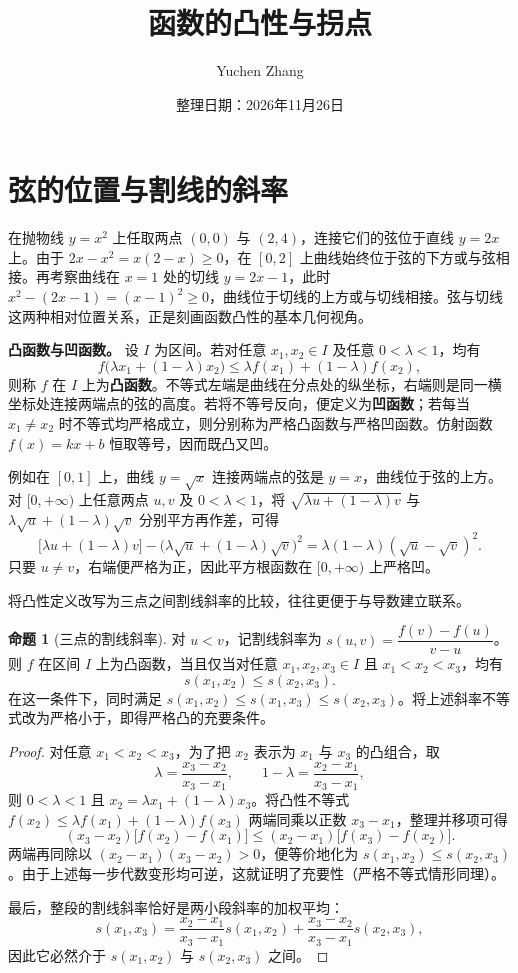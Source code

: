 \documentclass[UTF8,fontset=fandol,a4paper,12pt]{ctexart}
\title{函数的凸性与拐点}
\author{Yuchen Zhang}
\date{整理日期：2026年11月26日}
\makeatletter
\theoremstyle{definition}
\newtheorem{proposition}[theorem]{命题}
\renewcommand{\maketitle}{\begin{center}{\LARGE\bfseries\@title\par}\vspace{0.6em}\@author\par\vspace{0.2em}{\small\@date\par}\end{center}}
\makeatother
\begin{document}
\maketitle

\section{弦的位置与割线的斜率}
在抛物线 $y=x^2$ 上任取两点 $(0,0)$ 与 $(2,4)$，连接它们的弦位于直线 $y=2x$ 上。由于 $2x-x^2=x(2-x)\ge0$，在 $[0,2]$ 上曲线始终位于弦的下方或与弦相接。再考察曲线在 $x=1$ 处的切线 $y=2x-1$，此时 $x^2-(2x-1)=(x-1)^2\ge0$，曲线位于切线的上方或与切线相接。弦与切线这两种相对位置关系，正是刻画函数凸性的基本几何视角。

\textbf{凸函数与凹函数。} 设 $I$ 为区间。若对任意 $x_1,x_2\in I$ 及任意 $0<\lambda<1$，均有
\[
 f\bigl(\lambda x_1+(1-\lambda)x_2\bigr)
 \le\lambda f(x_1)+(1-\lambda)f(x_2),
\]
则称 $f$ 在 $I$ 上为\textbf{凸函数}。不等式左端是曲线在分点处的纵坐标，右端则是同一横坐标处连接两端点的弦的高度。若将不等号反向，便定义为\textbf{凹函数}；若每当 $x_1\ne x_2$ 时不等式均严格成立，则分别称为严格凸函数与严格凹函数。仿射函数 $f(x)=kx+b$ 恒取等号，因而既凸又凹。

例如在 $[0,1]$ 上，曲线 $y=\sqrt{x}$ 连接两端点的弦是 $y=x$，曲线位于弦的上方。对 $[0,+\infty)$ 上任意两点 $u,v$ 及 $0<\lambda<1$，将 $\sqrt{\lambda u+(1-\lambda)v}$ 与 $\lambda\sqrt{u}+(1-\lambda)\sqrt{v}$ 分别平方再作差，可得
\[
 \bigl[\lambda u+(1-\lambda)v\bigr]-\bigl(\lambda\sqrt{u}+(1-\lambda)\sqrt{v}\bigr)^2
 =\lambda(1-\lambda)(\sqrt{u}-\sqrt{v})^2.
\]
只要 $u\ne v$，右端便严格为正，因此平方根函数在 $[0,+\infty)$ 上严格凹。

将凸性定义改写为三点之间割线斜率的比较，往往更便于与导数建立联系。

\begin{proposition}[三点的割线斜率]
对 $u<v$，记割线斜率为 $s(u,v)=\dfrac{f(v)-f(u)}{v-u}$。则 $f$ 在区间 $I$ 上为凸函数，当且仅当对任意 $x_1,x_2,x_3\in I$ 且 $x_1<x_2<x_3$，均有
\[
 s(x_1,x_2)\le s(x_2,x_3).
\]
在这一条件下，同时满足 $s(x_1,x_2)\le s(x_1,x_3)\le s(x_2,x_3)$。将上述斜率不等式改为严格小于，即得严格凸的充要条件。
\end{proposition}

\begin{proof}
对任意 $x_1<x_2<x_3$，为了把 $x_2$ 表示为 $x_1$ 与 $x_3$ 的凸组合，取
\[
 \lambda=\frac{x_3-x_2}{x_3-x_1},\qquad
 1-\lambda=\frac{x_2-x_1}{x_3-x_1},
\]
则 $0<\lambda<1$ 且 $x_2=\lambda x_1+(1-\lambda)x_3$。将凸性不等式 $f(x_2)\le\lambda f(x_1)+(1-\lambda)f(x_3)$ 两端同乘以正数 $x_3-x_1$，整理并移项可得
\[
 (x_3-x_2)\bigl[f(x_2)-f(x_1)\bigr]
 \le (x_2-x_1)\bigl[f(x_3)-f(x_2)\bigr].
\]
两端再同除以 $(x_2-x_1)(x_3-x_2)>0$，便等价地化为 $s(x_1,x_2)\le s(x_2,x_3)$。由于上述每一步代数变形均可逆，这就证明了充要性（严格不等式情形同理）。

最后，整段的割线斜率恰好是两小段斜率的加权平均：
\[
 s(x_1,x_3)=\frac{x_2-x_1}{x_3-x_1}s(x_1,x_2)
           +\frac{x_3-x_2}{x_3-x_1}s(x_2,x_3),
\]
因此它必然介于 $s(x_1,x_2)$ 与 $s(x_2,x_3)$ 之间。
\end{proof}
\end{document}

